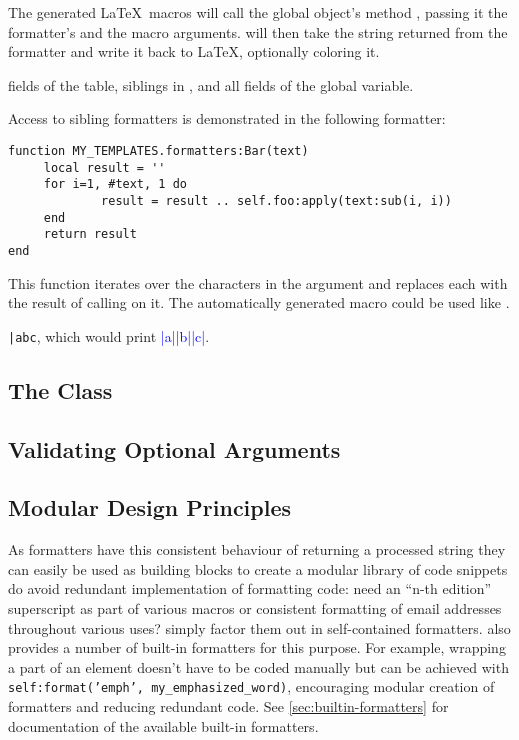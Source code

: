 \documentclass{scrartcl}
\begin{document}
The generated \LaTeX\ macros will call the global
 object's method , passing it the formatter's
 and the macro arguments.   will then take the
string returned from the formatter and write it back to \LaTeX, optionally
coloring it.




fields of the
 table, siblings in , and
all fields of the global  variable.

Access to sibling formatters is demonstrated in the following  formatter:

\begin{verbatim}
function MY_TEMPLATES.formatters:Bar(text)
	 local result = ''
	 for i=1, #text, 1 do
			 result = result .. self.foo:apply(text:sub(i, i))
	 end
	 return result
end
\end{verbatim}

\noindent This function iterates over the characters in the 
argument and replaces each with the result of calling  on it.  The
automatically generated macro could be used like .

\texttt{\bar{abc}},
which would print \textcolor{blue}{|a||b||c|}.


\subsection{The  Class}
\label{sec:the-formatter-class}


\subsection{Validating Optional Arguments}
\label{sec:validating-optional-arguments}

\subsection{Modular Design Principles}
\label{sec:modular-design-principles}

\medskip As formatters have this consistent behaviour of returning a processed
string they can easily be used as building blocks to create a modular library of
code snippets do avoid redundant implementation of formatting code: need an
“n-th edition” superscript as part of various macros or consistent formatting of
email addresses throughout various uses? simply factor them out in
self-contained formatters.   also provides a number of
built-in formatters for this purpose.  For example, wrapping a part of an
element \texttt{\emph{}} doesn't have to be coded manually but can be
achieved with \texttt{self:format('emph', my_emphasized_word)},
encouraging modular creation of formatters and reducing redundant code.  See
\vref{sec:builtin-formatters} for documentation of the available built-in
formatters.
\end{document}
